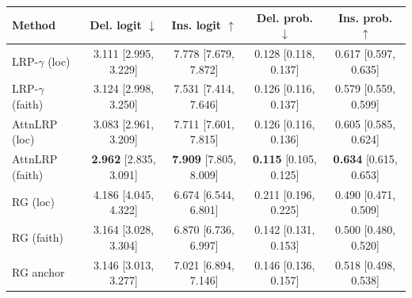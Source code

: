 \begin{tabular}{lcccc}
\toprule
Method & Del. logit $\downarrow$ & Ins. logit $\uparrow$ & Del. prob. $\downarrow$ & Ins. prob. $\uparrow$ \\
\midrule
LRP-$\gamma$ (loc) & 3.111 [2.995, 3.229] & 7.778 [7.679, 7.872] & 0.128 [0.118, 0.137] & 0.617 [0.597, 0.635] \\
LRP-$\gamma$ (faith) & 3.124 [2.998, 3.250] & 7.531 [7.414, 7.646] & 0.126 [0.116, 0.137] & 0.579 [0.559, 0.599] \\
AttnLRP (loc) & 3.083 [2.961, 3.209] & 7.711 [7.601, 7.815] & 0.126 [0.116, 0.136] & 0.605 [0.585, 0.624] \\
AttnLRP (faith) & \textbf{2.962} [2.835, 3.091] & \textbf{7.909} [7.805, 8.009] & \textbf{0.115} [0.105, 0.125] & \textbf{0.634} [0.615, 0.653] \\
RG (loc) & 4.186 [4.045, 4.322] & 6.674 [6.544, 6.801] & 0.211 [0.196, 0.225] & 0.490 [0.471, 0.509] \\
RG (faith) & 3.164 [3.028, 3.304] & 6.870 [6.736, 6.997] & 0.142 [0.131, 0.153] & 0.500 [0.480, 0.520] \\
RG anchor & 3.146 [3.013, 3.277] & 7.021 [6.894, 7.146] & 0.146 [0.136, 0.157] & 0.518 [0.498, 0.538] \\
\bottomrule
\end{tabular}
